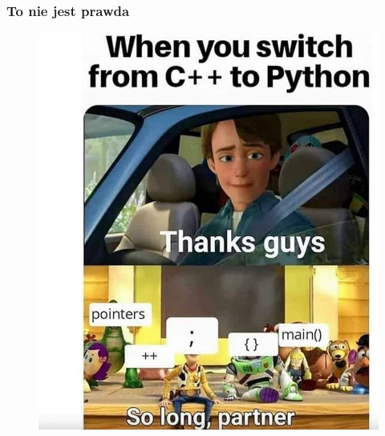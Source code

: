 \documentclass[10pt,t]{beamer}
\begin{document}
\begin{frame}
  \frametitle{To nie jest prawda}


  \begin{figure}

    \centering


    \includegraphics[scale=0.21]
    {./PresentationsPictures/Stupid-meme.jpg}

  \end{figure}

\end{frame}
\end{document}

